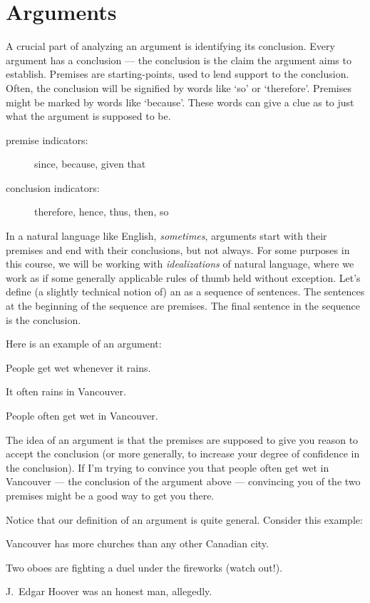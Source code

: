 \section{Arguments}
A crucial part of analyzing an argument is identifying its conclusion. Every argument has a conclusion --- the conclusion is the claim the argument aims to establish. Premises are starting-points, used to lend support to the conclusion. Often, the conclusion will be signified by words like `so' or `therefore'. Premises might be marked by words like `because'. These words can give a clue as to just what the argument is supposed to be.

\begin{description}
  \item[premise indicators:] since, because, given that
  \item[conclusion indicators:] therefore, hence, thus, then, so
\end{description}

In a natural language like English, \emph{sometimes}, arguments start with their premises and end with their conclusions, but not always. For some purposes in this course, we will be working with \emph{idealizations} of natural language, where we work as if some generally applicable rules of thumb held without exception. Let's define (a slightly technical notion of) an  as a sequence of sentences. The sentences at the beginning of the sequence are premises. The final sentence in the sequence is the conclusion.

Here is an example of an argument:

\begin{earg}
  \item[] People get wet whenever it rains.
  \item[] It often rains in Vancouver.
  \item[\therefore] People often get wet in Vancouver.
\end{earg}

The idea of an argument is that the premises are supposed to give you reason to accept the conclusion (or more generally, to increase your degree of confidence in the conclusion). If I'm trying to convince you that people often get wet in Vancouver --- the conclusion of the argument above --- convincing you of the two premises might be a good way to get you there.

Notice that our definition of an argument is quite general. Consider this example:
\begin{earg}
  \item[] Vancouver has more churches than any other Canadian city.
  \item[] Two oboes are fighting a duel under the fireworks (watch out!).
  \item[\therefore] J.\ Edgar Hoover was an honest man, allegedly.
\end{earg}

